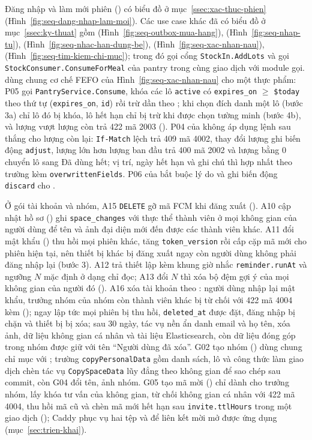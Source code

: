 Đăng nhập và làm mới phiên () có biểu đồ ở mục~\ref{ssec:xac-thuc-phien} (Hình~\ref{fig:seq-dang-nhap-lam-moi}). Các use case khác đã có biểu đồ ở mục~\ref{ssec:ky-thuat} gồm  (Hình~\ref{fig:seq-outbox-mua-hang}),  (Hình~\ref{fig:seq-nhap-tu}),  (Hình~\ref{fig:seq-nhac-han-dung-be}),  (Hình~\ref{fig:seq-xac-nhan-nau}),  (Hình~\ref{fig:seq-tim-kiem-chi-muc}); trong đó  gọi cổng \texttt{StockIn.AddLots} và  gọi \texttt{StockConsumer.ConsumeForMeal} của pantry trong cùng giao dịch với module gọi.  dùng chung cơ chế FEFO của Hình~\ref{fig:seq-xac-nhan-nau} cho một thực phẩm: P05 gọi \texttt{PantryService.Consume}, khóa các lô \texttt{active} có \texttt{expires\_on} $\ge$ \texttt{\$today} theo thứ tự (\texttt{expires\_on}, \texttt{id}) rồi trừ dần theo ; khi chọn đích danh một lô (bước 3a) chỉ lô đó bị khóa, lô hết hạn chỉ bị trừ khi được chọn tường minh (bước 4b), và lượng vượt lượng còn trả 422 mã 2003 (). P04 của  không áp dụng lệnh sau thắng cho lượng còn lại: \texttt{If-Match} lệch trả 409 mã 4002, thay đổi lượng ghi biến động \texttt{adjust}, lượng lớn hơn lượng ban đầu trả 400 mã 2002 và lượng bằng 0 chuyển lô sang Đã dùng hết; vị trí, ngày hết hạn và ghi chú thì hợp nhất theo trường kèm \texttt{overwrittenFields}. P06 của  bắt buộc lý do và ghi biến động \texttt{discard} cho .

Ở gói tài khoản và nhóm, A15 \texttt{DELETE}  gỡ mã FCM khi đăng xuất (). A10 cập nhật hồ sơ () ghi \texttt{space\_changes} với thực thể thành viên ở mọi không gian của người dùng để tên và ảnh đại diện mới đến được các thành viên khác. A11 đổi mật khẩu () thu hồi mọi phiên khác, tăng \texttt{token\_version} rồi cấp cặp mã mới cho phiên hiện tại, nên thiết bị khác bị đăng xuất ngay còn người dùng không phải đăng nhập lại (bước 3). A12 trả thiết lập kèm khung giờ nhắc \texttt{reminder.runAt} và ngưỡng $N$ mặc định ở dạng chỉ đọc; A13 đổi $N$ thì xóa bộ đệm gợi ý của mọi không gian của người đó (). A16 xóa tài khoản theo : người dùng nhập lại mật khẩu, trưởng nhóm của nhóm còn thành viên khác bị từ chối với 422 mã 4004 kèm  (); ngay lập tức mọi phiên bị thu hồi, \texttt{deleted\_at} được đặt, đăng nhập bị chặn và thiết bị bị xóa; sau 30 ngày, tác vụ nền ẩn danh email và họ tên, xóa ảnh, dữ liệu không gian cá nhân và tài liệu Elasticsearch, còn dữ liệu đóng góp trong nhóm được giữ với tên “Người dùng đã xóa”. G02 tạo nhóm () dùng chung chỉ mục  với ; trường \texttt{copyPersonalData} gồm danh sách, lô và công thức làm giao dịch chèn tác vụ \texttt{CopySpaceData} lũy đẳng theo không gian để sao chép sau commit, còn G04 đổi tên, ảnh nhóm. G05 tạo mã mời () chỉ dành cho trưởng nhóm, lấy khóa tư vấn của không gian, từ chối không gian cá nhân với 422 mã 4004, thu hồi mã cũ và chèn mã mới hết hạn sau \texttt{invite.ttlHours} trong một giao dịch (); Caddy phục vụ hai tệp  và  để liên kết mời mở được ứng dụng (mục~\ref{sec:trien-khai}).

